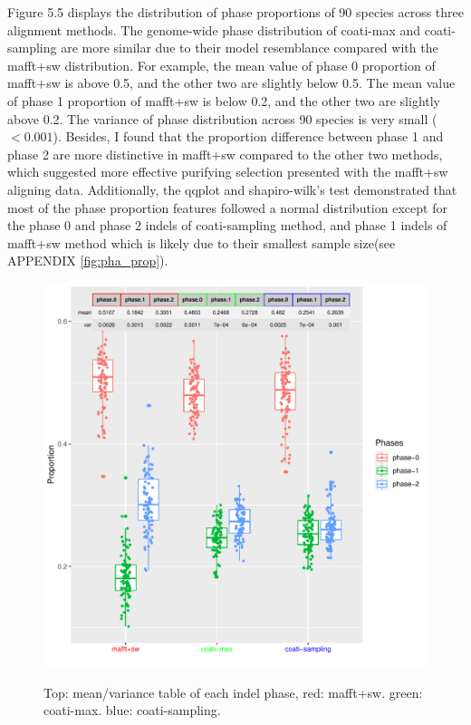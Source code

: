 Figure 5.5 displays the distribution of phase proportions of 90 species across three alignment methods. The genome-wide phase distribution of coati-max and coati-sampling are more similar due to their model resemblance compared with the mafft+sw distribution. For example, the mean value of phase 0 proportion of mafft+sw is above 0.5, and the other two are slightly below 0.5. The mean value of phase 1 proportion  of mafft+sw is below 0.2, and the other two are slightly above 0.2. The variance of phase distribution across 90 species is very small ($<0.001$). Besides, I found that the proportion difference between phase 1 and phase 2 are more distinctive in mafft+sw compared to the other two methods, which suggested more effective purifying selection presented with the mafft+sw aligning data. 
Additionally, the qqplot and shapiro-wilk’s test demonstrated that most of the phase proportion features followed a normal distribution except for the phase 0 and phase 2 indels of coati-sampling method, and phase 1 indels of mafft+sw method which is likely due to their smallest sample size(see APPENDIX \ref{fig:pha_prop}). 
\begin{figure}[H]
     \centering
     \begin{minipage}[t]{1\textwidth}
     \includegraphics[width=1\linewidth,height=1.1\linewidth]{Fig5.pdf}
     { { Top: mean/variance table of each indel phase,  red: mafft+sw. green: coati-max. blue: coati-sampling.} 
 \par}
     \end{minipage}
\end{figure}

